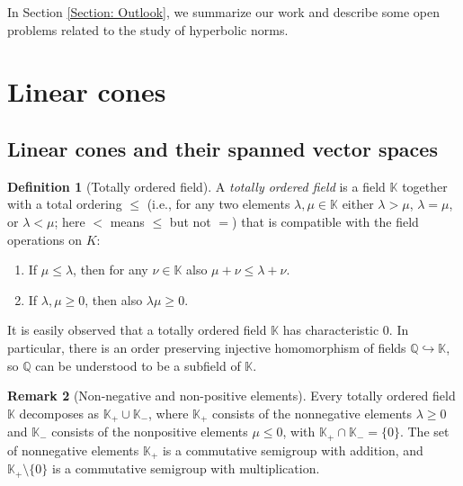 \documentclass[a4paper,11pt]{article}
\numberwithin{equation}{section}
\theoremstyle{definition}
\newtheorem{Definition}{Definition}[section]
\newtheorem{Remark}[Definition]{Remark}
\theoremstyle{plain}
\begin{document}
In Section \ref{Section: Outlook}, we summarize our work and describe some open problems related to the study of hyperbolic norms.


\section{Linear cones}\label{Section: linearcones}

\subsection{Linear cones and their spanned vector spaces}

\begin{Definition}[Totally ordered field]
A \emph{totally ordered field} is a field $\mathbb{K}$ together with a total ordering $\leq$ (i.e., for any two elements $\lambda, \mu \in \mathbb{K}$ either $\lambda > \mu$, $\lambda = \mu$, or $\lambda < \mu$; here $<$ means $\leq$ but not $=$) that is compatible with the field operations on $K$:
\begin{enumerate}
    \item[(i)] If $\mu \leq \lambda$, then for any $\nu \in \mathbb{K}$ also $\mu + \nu \leq \lambda + \nu$.
    \item[(ii)] If $\lambda, \mu \geq 0$, then also $\lambda \mu \geq 0$.
\end{enumerate}
\end{Definition}

It is easily observed that a totally ordered field $\mathbb{K}$ has characteristic $0$. In particular, there is an order preserving injective homomorphism of fields $\mathbb{Q} \hookrightarrow \mathbb{K}$, so $\mathbb{Q}$ can be understood to be a subfield of $\mathbb{K}$.

\begin{Remark}[Non-negative and non-positive elements]
    Every totally ordered field $\mathbb{K}$ decomposes as $\mathbb{K}_+ \cup \mathbb{K}_-$, where $\mathbb{K}_+$ consists of the nonnegative elements $\lambda \geq 0$ and $\mathbb{K}_-$ consists of the nonpositive elements $\mu \leq 0$, with $\mathbb{K}_+ \cap \mathbb{K}_- = \{0\}$. The set of nonnegative elements $\mathbb{K}_+$ is a commutative semigroup with addition, and $\mathbb{K}_+ \setminus \{0\}$ is a commutative semigroup with multiplication.
\end{Remark}
\end{document}
